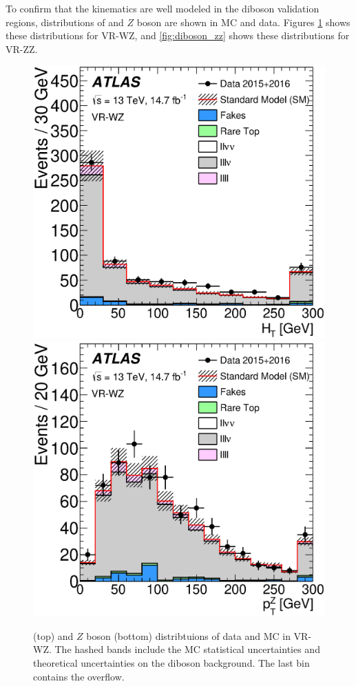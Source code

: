 To confirm that the kinematics are well modeled in the diboson validation regions, distributions of \HT and $Z$ boson \pt are shown in \ac{MC} and data. Figures \ref{fig:diboson_wz} shows these distributions for VR-WZ, and \autoref{fig:diboson_zz} shows these distributions for VR-ZZ. 


\begin{centering}
\begin{figure}[htbp]
\centering
\includegraphics[width=.9\textwidth]{figures/dibosons/figaux_11a.eps}
\includegraphics[width=.9\textwidth]{figures/dibosons/figaux_11b.eps}
\caption{\HT (top) and $Z$ boson \pt (bottom) distribtuions of data and \ac{MC} in VR-WZ. The hashed bands include the MC statistical uncertainties and theoretical uncertainties on the diboson background. The last bin contains the overflow. \label{fig:diboson_wz}}
\end{figure}
\end{centering}

